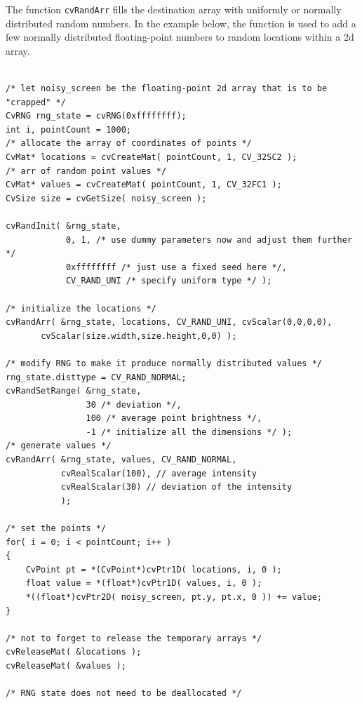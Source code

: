 \begin{description}
\end{description}

The function \texttt{cvRandArr} fills the destination array with uniformly
or normally distributed random numbers. In the example below, the function
is used to add a few normally distributed floating-point numbers to
random locations within a 2d array.

\begin{lstlisting}

/* let noisy_screen be the floating-point 2d array that is to be "crapped" */
CvRNG rng_state = cvRNG(0xffffffff);
int i, pointCount = 1000;
/* allocate the array of coordinates of points */
CvMat* locations = cvCreateMat( pointCount, 1, CV_32SC2 );
/* arr of random point values */
CvMat* values = cvCreateMat( pointCount, 1, CV_32FC1 );
CvSize size = cvGetSize( noisy_screen );

cvRandInit( &rng_state,
            0, 1, /* use dummy parameters now and adjust them further */
            0xffffffff /* just use a fixed seed here */,
            CV_RAND_UNI /* specify uniform type */ );

/* initialize the locations */
cvRandArr( &rng_state, locations, CV_RAND_UNI, cvScalar(0,0,0,0), 
	   cvScalar(size.width,size.height,0,0) );

/* modify RNG to make it produce normally distributed values */
rng_state.disttype = CV_RAND_NORMAL;
cvRandSetRange( &rng_state,
                30 /* deviation */,
                100 /* average point brightness */,
                -1 /* initialize all the dimensions */ );
/* generate values */
cvRandArr( &rng_state, values, CV_RAND_NORMAL,
           cvRealScalar(100), // average intensity
           cvRealScalar(30) // deviation of the intensity
           );

/* set the points */
for( i = 0; i < pointCount; i++ )
{
    CvPoint pt = *(CvPoint*)cvPtr1D( locations, i, 0 );
    float value = *(float*)cvPtr1D( values, i, 0 );
    *((float*)cvPtr2D( noisy_screen, pt.y, pt.x, 0 )) += value;
}

/* not to forget to release the temporary arrays */
cvReleaseMat( &locations );
cvReleaseMat( &values );

/* RNG state does not need to be deallocated */

\end{lstlisting}

